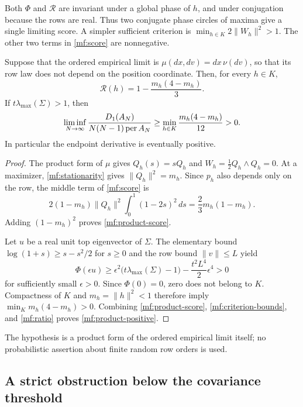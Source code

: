 Both \(\Phi\) and \(\mathcal R\) are invariant under a global phase of
\(h\), and under conjugation because the rows are real.
Thus two conjugate phase circles of maxima give a single limiting score.
A simpler sufficient criterion is
\(\min_{h\in K}2\|W_h\|^2>1\). The other two terms in
\eqref{mf:score} are nonnegative.

\begin{corollary}\label{mf:product-limit}
Suppose that the ordered empirical limit is
\(\mu(dx,dv)=dx\,\nu(dv)\), so that its row law does not depend on
the position coordinate. Then, for every \(h\in K\),
\begin{equation}\label{mf:product-score}
 \mathcal R(h)=1-\frac{m_h(4-m_h)}3.
\end{equation}
If \(t\lambda_{\max}(\Sigma)>1\), then
\begin{equation}\label{mf:product-positive}
 \liminf_{N\to\infty}
 \frac{D_1(A_N)}{N(N-1)\operatorname{per} A_N}
 \ge\min_{h\in K}\frac{m_h(4-m_h)}{12}>0.
\end{equation}
In particular the endpoint derivative is eventually positive.
\end{corollary}
\begin{proof}
The product form of \(\mu\) gives \(Q_h(s)=sQ_h\) and
\(W_h=\tfrac12 Q_h\wedge Q_h=0\). At a maximizer,
\eqref{mf:stationarity} gives \(\|Q_h\|^2=m_h\). Since \(p_h\)
also depends only on the row, the middle term of \eqref{mf:score} is
\[
 2(1-m_h)\|Q_h\|^2\int_0^1(1-2s)^2\,ds
 =\frac23m_h(1-m_h).
\]
Adding \((1-m_h)^2\) proves \eqref{mf:product-score}.

Let \(u\) be a real unit top eigenvector of \(\Sigma\). The elementary
bound \(\log(1+s)\ge s-s^2/2\) for \(s\ge0\) and the row bound
\(\|v\|\le L\) yield
\[
 \Phi(\epsilon u)
 \ge\epsilon^2\bigl(t\lambda_{\max}(\Sigma)-1\bigr)
       -\frac{t^2L^4}{2}\epsilon^4>0
\]
for sufficiently small \(\epsilon>0\). Since \(\Phi(0)=0\), zero
does not belong to \(K\). Compactness of \(K\) and
\(m_h=\|h\|^2<1\) therefore imply
\(\min_K m_h(4-m_h)>0\).
Combining \eqref{mf:product-score}, \eqref{mf:criterion-bounds}, and
\eqref{mf:ratio} proves \eqref{mf:product-positive}.
\end{proof}

The hypothesis is a product form of the ordered empirical limit itself;
no probabilistic assertion about finite random row orders is used.

\subsection{A strict obstruction below the covariance threshold}

